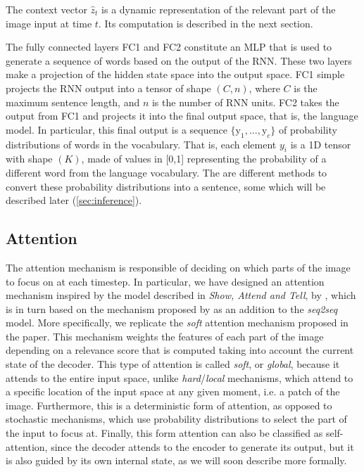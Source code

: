 The context vector $\hat{z}_t$ is a dynamic representation of the relevant part of the image input at time $t$. Its computation is described in the next section.

The fully connected layers FC1 and FC2 constitute an MLP that is used to generate a sequence of words based on the output of the RNN. These two layers make a projection of the hidden state space into the output space. FC1 simple projects the RNN output into a tensor of shape $(C, n)$, where $C$ is the maximum sentence length, and $n$ is the number of RNN units. FC2 takes the output from FC1 and projects it into the final output space, that is, the language model. In particular, this final output is a sequence  $\{\text{y}_1,..., \text{y}_c\}$ of probability distributions of words in the vocabulary. That is, each element $y_i$ is a 1D tensor with shape $(K)$, made of values in [0,1] representing the probability of a different word from the language vocabulary. The are different methods to convert these probability distributions into a sentence, some which will be described later (\cref{sec:inference}).

\subsection{Attention}\label{subsec:attention}

The attention mechanism is responsible of deciding on which parts of the image to focus on at each timestep. In particular, we have designed an attention mechanism inspired by the model described in \textit{Show, Attend and Tell}, by \citet{Xu2015}, which is in turn based on the mechanism proposed by \citet{Bahdanau2015} as an addition to the \textit{seq2seq} model. More specifically, we replicate the  \textit{soft} attention mechanism proposed in the paper. This mechanism weights the features of each part of the image depending on a relevance score that is computed taking into account the current state of the decoder. This type of attention is called \textit{soft}, or \textit{global}, because it attends to the entire input space, unlike \textit{hard}/\textit{local} mechanisms, which attend to a specific location of the input space at any given moment, i.e. a patch of the image. Furthermore, this is a deterministic form of attention, as opposed to stochastic mechanisms, which use probability distributions to select the part of the input to focus at. Finally, this form attention can also be classified as self-attention, since the decoder attends to the encoder to generate its output, but it is also guided by its own internal state, as we will soon describe more formally.

